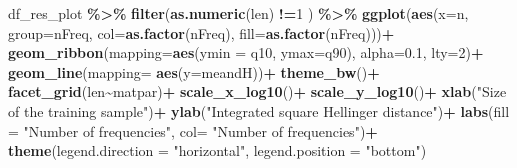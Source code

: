 \documentclass[
]{article}
\newenvironment{Shaded}{\begin{snugshade}}{\end{snugshade}}
\newcommand{\AttributeTok}[1]{\textcolor[rgb]{0.13,0.29,0.53}{#1}}
\newcommand{\DecValTok}[1]{\textcolor[rgb]{0.00,0.00,0.81}{#1}}
\newcommand{\FloatTok}[1]{\textcolor[rgb]{0.00,0.00,0.81}{#1}}
\newcommand{\FunctionTok}[1]{\textcolor[rgb]{0.13,0.29,0.53}{\textbf{#1}}}
\newcommand{\NormalTok}[1]{#1}
\newcommand{\SpecialCharTok}[1]{\textcolor[rgb]{0.81,0.36,0.00}{\textbf{#1}}}
\newcommand{\StringTok}[1]{\textcolor[rgb]{0.31,0.60,0.02}{#1}}
\begin{document}
\begin{Shaded}
\begin{Highlighting}[]

\NormalTok{df\_res\_plot }\SpecialCharTok{\%\textgreater{}\%}
  \FunctionTok{filter}\NormalTok{(}\FunctionTok{as.numeric}\NormalTok{(len) }\SpecialCharTok{!=}\DecValTok{1}\NormalTok{ ) }\SpecialCharTok{\%\textgreater{}\%}
  \FunctionTok{ggplot}\NormalTok{(}\FunctionTok{aes}\NormalTok{(}\AttributeTok{x=}\NormalTok{n, }\AttributeTok{group=}\NormalTok{nFreq, }
             \AttributeTok{col=}\FunctionTok{as.factor}\NormalTok{(nFreq), }\AttributeTok{fill=}\FunctionTok{as.factor}\NormalTok{(nFreq)))}\SpecialCharTok{+}
  \FunctionTok{geom\_ribbon}\NormalTok{(}\AttributeTok{mapping=}\FunctionTok{aes}\NormalTok{(}\AttributeTok{ymin =}\NormalTok{ q10, }\AttributeTok{ymax=}\NormalTok{q90), }\AttributeTok{alpha=}\FloatTok{0.1}\NormalTok{, }\AttributeTok{lty=}\DecValTok{2}\NormalTok{)}\SpecialCharTok{+}
  \FunctionTok{geom\_line}\NormalTok{(}\AttributeTok{mapping=} \FunctionTok{aes}\NormalTok{(}\AttributeTok{y=}\NormalTok{meandH))}\SpecialCharTok{+}
  \FunctionTok{theme\_bw}\NormalTok{()}\SpecialCharTok{+}
  \FunctionTok{facet\_grid}\NormalTok{(len}\SpecialCharTok{\textasciitilde{}}\NormalTok{matpar)}\SpecialCharTok{+}
  \FunctionTok{scale\_x\_log10}\NormalTok{()}\SpecialCharTok{+}
  \FunctionTok{scale\_y\_log10}\NormalTok{()}\SpecialCharTok{+}
  \FunctionTok{xlab}\NormalTok{(}\StringTok{"Size of the training sample"}\NormalTok{)}\SpecialCharTok{+}
  \FunctionTok{ylab}\NormalTok{(}\StringTok{"Integrated square Hellinger distance"}\NormalTok{)}\SpecialCharTok{+}
  \FunctionTok{labs}\NormalTok{(}\AttributeTok{fill =} \StringTok{"Number of frequencies"}\NormalTok{,}
       \AttributeTok{col=} \StringTok{"Number of frequencies"}\NormalTok{)}\SpecialCharTok{+}
  \FunctionTok{theme}\NormalTok{(}\AttributeTok{legend.direction =} \StringTok{"horizontal"}\NormalTok{, }\AttributeTok{legend.position =} \StringTok{"bottom"}\NormalTok{)}
\end{Highlighting}
\end{Shaded}
\end{document}
